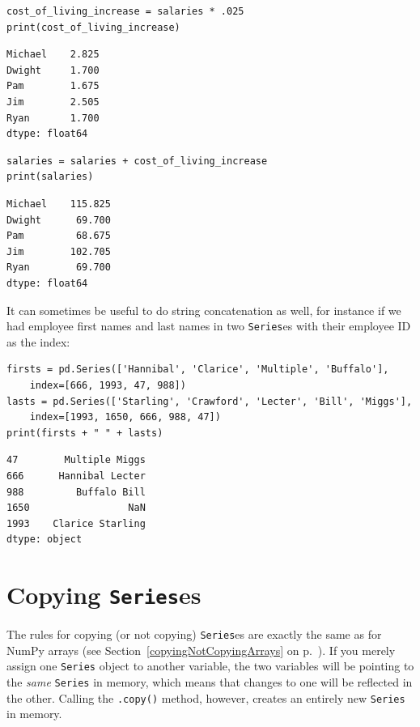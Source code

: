 \begin{Verbatim}[fontsize=\small,samepage=true,frame=single,framesep=3mm]
cost_of_living_increase = salaries * .025
print(cost_of_living_increase)
\end{Verbatim}

\begin{Verbatim}[fontsize=\small,samepage=true,frame=leftline,framesep=5mm,framerule=1mm]
Michael    2.825
Dwight     1.700
Pam        1.675
Jim        2.505
Ryan       1.700
dtype: float64
\end{Verbatim}

\begin{Verbatim}[fontsize=\small,samepage=true,frame=single,framesep=3mm]
salaries = salaries + cost_of_living_increase
print(salaries)
\end{Verbatim}

\begin{Verbatim}[fontsize=\small,samepage=true,frame=leftline,framesep=5mm,framerule=1mm]
Michael    115.825
Dwight      69.700
Pam         68.675
Jim        102.705
Ryan        69.700
dtype: float64
\end{Verbatim}

It can sometimes be useful to do string concatenation as well, for instance if
we had employee first names and last names in two \texttt{Series}es with their
employee ID as the index:

\begin{Verbatim}[fontsize=\small,samepage=true,frame=single,framesep=3mm]
firsts = pd.Series(['Hannibal', 'Clarice', 'Multiple', 'Buffalo'],
    index=[666, 1993, 47, 988])
lasts = pd.Series(['Starling', 'Crawford', 'Lecter', 'Bill', 'Miggs'],
    index=[1993, 1650, 666, 988, 47])
print(firsts + " " + lasts)
\end{Verbatim}

\begin{Verbatim}[fontsize=\small,samepage=true,frame=leftline,framesep=5mm,framerule=1mm]
47        Multiple Miggs
666      Hannibal Lecter
988         Buffalo Bill
1650                 NaN
1993    Clarice Starling
dtype: object
\end{Verbatim}

\section{Copying \texttt{Series}es}

The rules for copying (or not copying) \texttt{Series}es are exactly the same
as for NumPy arrays (see Section~\ref{copyingNotCopyingArrays} on
p.~\pageref{copyingNotCopyingArrays}). If you merely assign one \texttt{Series}
object to another variable, the two variables will be pointing to the
\textit{same} \texttt{Series} in memory, which means that changes to one will
be reflected in the other. Calling the \texttt{.copy()} method, however,
creates an entirely new \texttt{Series} in memory.

